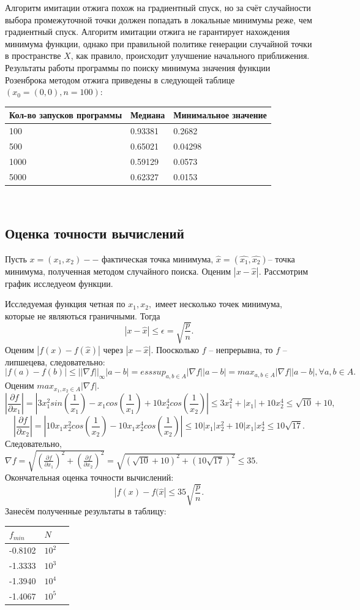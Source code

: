 \documentclass[11pt]{article}
\numberwithin{equation}{section}
\begin{document}
Алгоритм имитации отжига похож на градиентный спуск,
но за счёт случайности выбора промежуточной точки должен попадать в локальные минимумы реже,
чем градиентный спуск.
Алгоритм имитации отжига не гарантирует нахождения минимума функции, однако при правильной политике генерации случайной точки в пространстве $X$, как правило, происходит улучшение начального приближения.
Результаты работы программы по поиску минимума значения функции Розенброка методом отжига приведены в следующей таблице $(x_0 = (0, 0), n = 100)$:
\\
\begin{tabular}{ | l | l | l | }
  \hline
  Кол-во запусков программы & Медиана & Минимальное значение \\ \hline
  100 & 0.93381 &  0.2682 \\
  500 & 0.65021 & 0.04298 \\
  1000 & 0.59129 & 0.0573 \\
  5000 & 0.62327 &  0.0153 \\
  \hline
\end{tabular}
\\
\subsection{Оценка точности вычислений}
Пусть $x=(x_1,x_2) --$ фактическая точка минимума, $\hat{x} = (\hat{x_1},\hat{x_2})$-- точка минимума, полученная методом случайного поиска.
Оценим $|x-\hat{x}|.$ Рассмотрим график исследуеом функции.

Исследуемая функция четная по $x_1,x_2,$ имеет несколько точек минимума, которые не являються граничными.
Тогда
$$ |x-\hat{x}|\leq\epsilon = \sqrt{\frac{p}{n}}.$$
Оценим $|f(x)-f(\hat{x})|$ через $|x-\hat{x}|.$
Поосколько $f$ -- непрерывна, то $f$ -- липшецева, следовательно:
$$|f(a)-f(b)| \leq || \nabla f||_{\infty}|a-b| = esssup_{a,b \in A} |\nabla f| |a-b| = max_{a,b \in A} |\nabla f| |a-b|, \forall a,b \in A.$$
Оценим $max_{x_1, x_2 \in A} |\nabla f|.$
$$|\frac{\partial f}{\partial x_1}| = |3x_1^2 sin(\frac{1}{x_1})-x_1 cos(\frac{1}{x_1})+10x_2^4 cos(\frac{1}{x_2})| \leq 3x_1^2 + |x_1| + 10x_2^4 \leq \sqrt{10}+10,$$
$$|\frac{\partial f}{\partial x_2}| = |10 x_1 x_2^2 cos(\frac{1}{x_2}) - 10 x_1 x_2^4 cos(\frac{1}{x_2})| \leq 10 |x_1|x_2^2+10|x_1|x_2^4\leq 10 \sqrt{17}.$$
Следовательно, $\nabla f =\sqrt{ (\frac{\partial f}{\partial x_1})^2 + (\frac{\partial f}{\partial x_2})^2} = \sqrt{(\sqrt{10}+10)^2+(10\sqrt{17})^2 } \leq 35.$ 
Окончательная оценка точности вычислений:
$$ |f(x)-f(\hat{x}| \leq 35 \sqrt{\frac{p}{n}}.$$
Занесём полученные результаты в таблицу:
\\
\begin{tabular}{ | l | l | l | }
  \hline
  $f_{min}$ & $N$ \\ \hline
  -0.8102 & $10^2$ \\  \hline
  -1.3333 & $10^3$ \\  \hline
  -1.3940 & $10^4$ \\  \hline
  -1.4067 & $10^5$ \\
  \hline
\end{tabular}
\\
\end{document}
